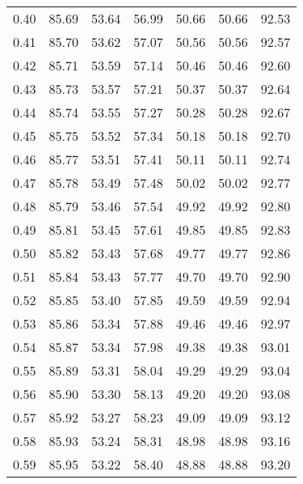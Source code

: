 \begin{tabular}{|c|c|c|c|c|c|c|}
      0.40 &     85.69 &     53.64 &      56.99 &   50.66 &      50.66 &         92.53 \\
      0.41 &     85.70 &     53.62 &      57.07 &   50.56 &      50.56 &         92.57 \\
      0.42 &     85.71 &     53.59 &      57.14 &   50.46 &      50.46 &         92.60 \\
      0.43 &     85.73 &     53.57 &      57.21 &   50.37 &      50.37 &         92.64 \\
      0.44 &     85.74 &     53.55 &      57.27 &   50.28 &      50.28 &         92.67 \\
      0.45 &     85.75 &     53.52 &      57.34 &   50.18 &      50.18 &         92.70 \\
      0.46 &     85.77 &     53.51 &      57.41 &   50.11 &      50.11 &         92.74 \\
      0.47 &     85.78 &     53.49 &      57.48 &   50.02 &      50.02 &         92.77 \\
      0.48 &     85.79 &     53.46 &      57.54 &   49.92 &      49.92 &         92.80 \\
      0.49 &     85.81 &     53.45 &      57.61 &   49.85 &      49.85 &         92.83 \\
      0.50 &     85.82 &     53.43 &      57.68 &   49.77 &      49.77 &         92.86 \\
      0.51 &     85.84 &     53.43 &      57.77 &   49.70 &      49.70 &         92.90 \\
      0.52 &     85.85 &     53.40 &      57.85 &   49.59 &      49.59 &         92.94 \\
      0.53 &     85.86 &     53.34 &      57.88 &   49.46 &      49.46 &         92.97 \\
      0.54 &     85.87 &     53.34 &      57.98 &   49.38 &      49.38 &         93.01 \\
      0.55 &     85.89 &     53.31 &      58.04 &   49.29 &      49.29 &         93.04 \\
      0.56 &     85.90 &     53.30 &      58.13 &   49.20 &      49.20 &         93.08 \\
      0.57 &     85.92 &     53.27 &      58.23 &   49.09 &      49.09 &         93.12 \\
      0.58 &     85.93 &     53.24 &      58.31 &   48.98 &      48.98 &         93.16 \\
      0.59 &     85.95 &     53.22 &      58.40 &   48.88 &      48.88 &         93.20 \\

\end{tabular}
